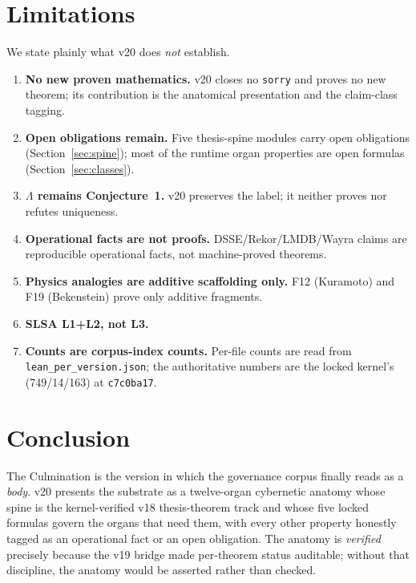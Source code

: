 \documentclass[11pt]{article}
\theoremstyle{plain}
\theoremstyle{definition}
\theoremstyle{remark}
\newcommand{\La}{\Lambda}
\begin{document}
\section{Limitations}
\label{sec:limits}

We state plainly what v20 does \emph{not} establish.

\begin{enumerate}[leftmargin=1.4em]
\item \textbf{No new proven mathematics.} v20 closes no \texttt{sorry} and proves no new
theorem; its contribution is the anatomical presentation and the claim-class tagging.
\item \textbf{Open obligations remain.} Five thesis-spine modules carry open obligations
(Section~\ref{sec:spine}); most of the runtime organ properties are open formulas
(Section~\ref{sec:classes}).
\item \textbf{$\La$ remains Conjecture~1.} v20 preserves the label; it neither proves nor
refutes uniqueness.
\item \textbf{Operational facts are not proofs.} DSSE/Rekor/LMDB/Wayra claims are
reproducible operational facts, not machine-proved theorems.
\item \textbf{Physics analogies are additive scaffolding only.} F12 (Kuramoto) and F19
(Bekenstein) prove only additive fragments.
\item \textbf{SLSA L1+L2, not L3.}
\item \textbf{Counts are corpus-index counts.} Per-file counts are read from
\texttt{lean\_per\_version.json}; the authoritative numbers are the locked kernel's
(749/14/163) at \texttt{c7c0ba17}.
\end{enumerate}

\section{Conclusion}
\label{sec:conclusion}

The Culmination is the version in which the governance corpus finally reads as a
\emph{body}. v20 presents the substrate as a twelve-organ cybernetic anatomy whose spine
is the kernel-verified v18 thesis-theorem track and whose five locked formulas govern
the organs that need them, with every other property honestly tagged as an operational
fact or an open obligation. The anatomy is \emph{verified} precisely because the v19
bridge made per-theorem status auditable; without that discipline, the anatomy would be
asserted rather than checked.
\end{document}

